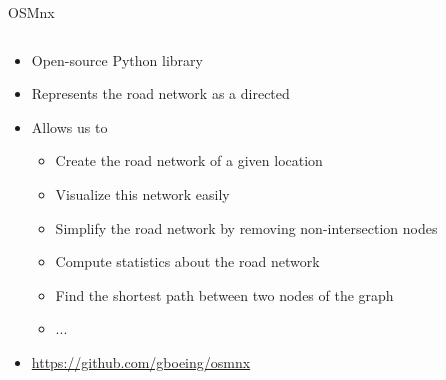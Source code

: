 \documentclass[aspectratio=169]{beamer}
\begin{document}
\begin{frame}{OSMnx \cite{boeing2017osmnx}}
\begin{columns}
\begin{column}{0.75\textwidth}
	
	\begin{itemize}
		\item Open-source Python library
		\item Represents the road network as a directed
		\item Allows us to
		\begin{itemize}
			\item Create the road network of a given location
			\item Visualize this network easily
			\item Simplify the road network by removing non-intersection nodes
			\item Compute statistics about the road network
			\item Find the shortest path between two nodes of the graph
			\item ...
		\end{itemize}
		\item \url{https://github.com/gboeing/osmnx}
	\end{itemize}
\end{column}
\begin{column}{0.25\textwidth}  %
    \begin{center}

\end{center}
\end{column}
\end{columns}
\end{frame}
\end{document}
